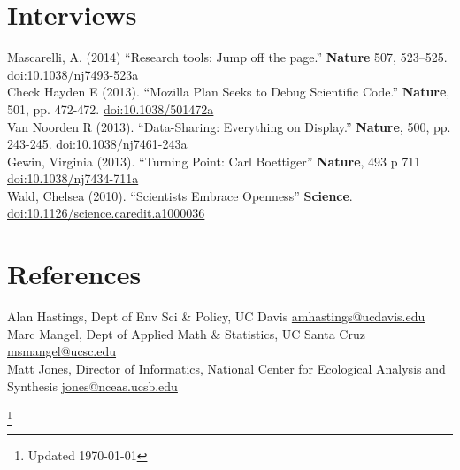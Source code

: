 \documentclass[margin]{res}
\begin{document}
\begin{resume}
\section{Interviews}

Mascarelli, A. (2014) ``Research tools: Jump off the page.'' \textbf{Nature} 507, 523–525. \href{http://doi.org/10.1038/nj7493-523a}{doi:10.1038/nj7493-523a} \\
Check Hayden E (2013). ``Mozilla Plan Seeks to Debug Scientific Code.'' \textbf{Nature}, 501, pp. 472-472. \href{http://doi.org/10.1038/501472a}{doi:10.1038/501472a} \\ 
Van Noorden R (2013). ``Data-Sharing: Everything on Display.'' \textbf{Nature}, 500, pp. 243-245. \href{http://doi.org/10.1038/nj7461-243a}{doi:10.1038/nj7461-243a} \\
Gewin, Virginia (2013). ``Turning Point: Carl Boettiger'' \textbf{Nature}, 493 p 711 \href{http://doi.org/10.1038/nj7434-711a}{doi:10.1038/nj7434-711a} \\
Wald, Chelsea (2010). ``Scientists Embrace Openness'' \textbf{Science}. \href{http://doi.org/10.1126/science.caredit.a1000036}{doi:10.1126/science.caredit.a1000036} 

\section{References}

Alan Hastings, Dept of Env Sci \& Policy, UC Davis \href{mailto:amhastings@ucdavis.edu}{amhastings@ucdavis.edu} \\ 
Marc Mangel, Dept of Applied Math \& Statistics, UC Santa Cruz \href{mailto:msmangel@ucsc.edu}{msmangel@ucsc.edu} \\
Matt Jones, Director of Informatics, National Center for Ecological Analysis and Synthesis \href{mailto:jones@nceas.ucsv.edu}{jones@nceas.ucsb.edu} \\






\end{resume}
\let\thefootnote\relax\footnote{Updated \today}
\end{document}

